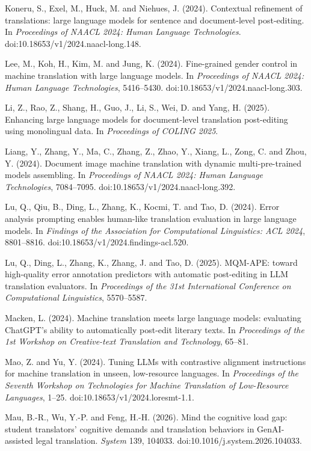 \documentclass[11pt]{article}
\begin{document}
Koneru, S., Exel, M., Huck, M. and Niehues, J. (2024). Contextual refinement of translations: large language models for sentence and document-level post-editing. In \emph{Proceedings of NAACL 2024: Human Language Technologies}. doi:10.18653/v1/2024.naacl-long.148.

Lee, M., Koh, H., Kim, M. and Jung, K. (2024). Fine-grained gender control in machine translation with large language models. In \emph{Proceedings of NAACL 2024: Human Language Technologies}, 5416--5430. doi:10.18653/v1/2024.naacl-long.303.

Li, Z., Rao, Z., Shang, H., Guo, J., Li, S., Wei, D. and Yang, H. (2025). Enhancing large language models for document-level translation post-editing using monolingual data. In \emph{Proceedings of COLING 2025}.

Liang, Y., Zhang, Y., Ma, C., Zhang, Z., Zhao, Y., Xiang, L., Zong, C. and Zhou, Y. (2024). Document image machine translation with dynamic multi-pre-trained models assembling. In \emph{Proceedings of NAACL 2024: Human Language Technologies}, 7084--7095. doi:10.18653/v1/2024.naacl-long.392.

Lu, Q., Qiu, B., Ding, L., Zhang, K., Kocmi, T. and Tao, D. (2024). Error analysis prompting enables human-like translation evaluation in large language models. In \emph{Findings of the Association for Computational Linguistics: ACL 2024}, 8801--8816. doi:10.18653/v1/2024.findings-acl.520.

Lu, Q., Ding, L., Zhang, K., Zhang, J. and Tao, D. (2025). MQM-APE: toward high-quality error annotation predictors with automatic post-editing in LLM translation evaluators. In \emph{Proceedings of the 31st International Conference on Computational Linguistics}, 5570--5587.

Macken, L. (2024). Machine translation meets large language models: evaluating ChatGPT's ability to automatically post-edit literary texts. In \emph{Proceedings of the 1st Workshop on Creative-text Translation and Technology}, 65--81.

Mao, Z. and Yu, Y. (2024). Tuning LLMs with contrastive alignment instructions for machine translation in unseen, low-resource languages. In \emph{Proceedings of the Seventh Workshop on Technologies for Machine Translation of Low-Resource Languages}, 1--25. doi:10.18653/v1/2024.loresmt-1.1.

Mau, B.-R., Wu, Y.-P. and Feng, H.-H. (2026). Mind the cognitive load gap: student translators' cognitive demands and translation behaviors in GenAI-assisted legal translation. \emph{System} 139, 104033. doi:10.1016/j.system.2026.104033.
\end{document}
